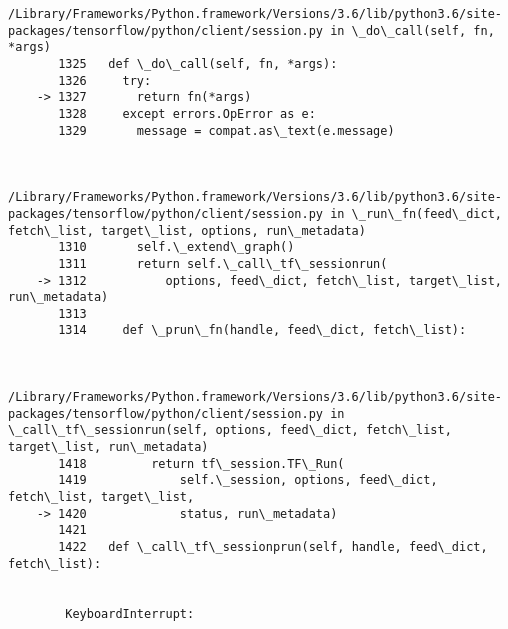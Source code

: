 \documentclass[11pt]{article}
\begin{document}
\begin{Verbatim}[commandchars=\\\{\}]
        /Library/Frameworks/Python.framework/Versions/3.6/lib/python3.6/site-packages/tensorflow/python/client/session.py in \_do\_call(self, fn, *args)
       1325   def \_do\_call(self, fn, *args):
       1326     try:
    -> 1327       return fn(*args)
       1328     except errors.OpError as e:
       1329       message = compat.as\_text(e.message)


        /Library/Frameworks/Python.framework/Versions/3.6/lib/python3.6/site-packages/tensorflow/python/client/session.py in \_run\_fn(feed\_dict, fetch\_list, target\_list, options, run\_metadata)
       1310       self.\_extend\_graph()
       1311       return self.\_call\_tf\_sessionrun(
    -> 1312           options, feed\_dict, fetch\_list, target\_list, run\_metadata)
       1313 
       1314     def \_prun\_fn(handle, feed\_dict, fetch\_list):


        /Library/Frameworks/Python.framework/Versions/3.6/lib/python3.6/site-packages/tensorflow/python/client/session.py in \_call\_tf\_sessionrun(self, options, feed\_dict, fetch\_list, target\_list, run\_metadata)
       1418         return tf\_session.TF\_Run(
       1419             self.\_session, options, feed\_dict, fetch\_list, target\_list,
    -> 1420             status, run\_metadata)
       1421 
       1422   def \_call\_tf\_sessionprun(self, handle, feed\_dict, fetch\_list):


        KeyboardInterrupt: 

    \end{Verbatim}


    
    
    
    
\end{document}
